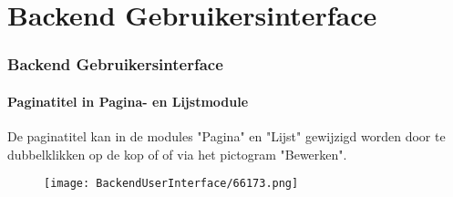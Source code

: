 %

\section{Backend Gebruikersinterface}

\begin{frame}[fragile]
	\frametitle{Backend Gebruikersinterface}
	\framesubtitle{Paginatitel in Pagina- en Lijstmodule}

	De paginatitel kan in de modules "Pagina" en "Lijst" gewijzigd worden door te dubbelklikken op de kop of
	of via het pictogram "Bewerken".

	\begin{figure}
		\texttt{[image: BackendUserInterface/66173.png]}
	\end{figure}

\end{frame}

